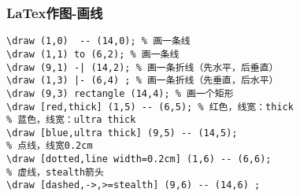 \begin{frame}[fragile]
\frametitle{LaTex作图-画线}

\begin{lstlisting}
\draw (1,0)  -- (14,0); % 画一条线
\draw (1,1) to (6,2); % 画一条线
\draw (9,1) -| (14,2); % 画一条折线（先水平，后垂直）
\draw (1,3) |- (6,4) ; % 画一条折线（先垂直，后水平）
\draw (9,3) rectangle (14,4); % 画一个矩形
\draw [red,thick] (1,5) -- (6,5); % 红色，线宽：thick
% 蓝色，线宽：ultra thick
\draw [blue,ultra thick] (9,5) -- (14,5); 
% 点线，线宽0.2cm
\draw [dotted,line width=0.2cm] (1,6) -- (6,6); 
% 虚线，stealth箭头
\draw [dashed,->,>=stealth] (9,6) -- (14,6) ; 
\end{lstlisting}
\end{frame}